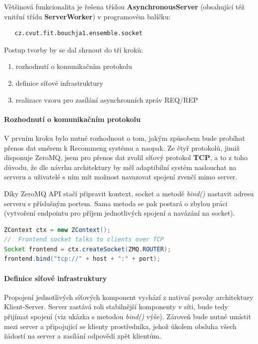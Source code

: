\documentclass[thesis=M,czech]{FITthesis}[2014/05/07]
\begin{document}
Většinová funkcionalita je řešena třídou \textbf{AsynchronousServer} (obsahující též vnitřní třídu \textbf{ServerWorker}) v programovém balíčku:

\begin{verbatim}
   cz.cvut.fit.bouchja1.ensemble.socket
\end{verbatim}

Postup tvorby by se dal shrnout do tří kroků:

\begin{enumerate}
	\item rozhodnutí o komunikačním protokolu
	\item definice síťové infrastruktury
	\item realizace vzoru pro zasílání asynchronních zpráv REQ/REP
\end{enumerate}

\paragraph{Rozhodnutí o komunikačním protokolu}
\label{subsub:kompr}
V prvním kroku bylo nutné rozhodnout o tom, jakým způsobem bude probíhat přenos dat směrem k Recommeng systému a naopak. Ze čtyř protokolů, jimiž disponuje ZeroMQ, jsem pro přenos dat zvolil síťový protokol \textbf{TCP}, a to z toho důvodu, že dle návrhu architektury by měl adaptibilní systém naslouchat na serveru a uživatelé s ním mít možnost navazovat spojení zvenčí mimo server.

Díky ZeroMQ API stačí připravit kontext, socket a metodě \emph{bind()} nastavit adresu serveru s příslušným portem. Sama metoda se pak postará o zbylou práci (vytvoření endpointu pro příjem jednotlivých spojení a navázání na socket).

\begin{lstlisting}[language=java]
ZContext ctx = new ZContext();
//  Frontend socket talks to clients over TCP
Socket frontend = ctx.createSocket(ZMQ.ROUTER);
frontend.bind("tcp://" + host + ":" + port);
\end{lstlisting}

\paragraph{Definice síťové infrastruktury}
\label{subsub:queue}
Propojení jednotlivých síťových komponent vychází z nativní povahy architektury Klient-Server. Server zastává roli stabilnější komponenty v síti, bude tedy přijímat spojení (viz ukázka s metodou \emph{bind()} výše). Zároveň bude nutné umístit mezi server a připojující se klienty prostředníka, jehož úkolem obsluha všech žádostí na server a zasílání odpovědí zpět klientům.
\end{document}
